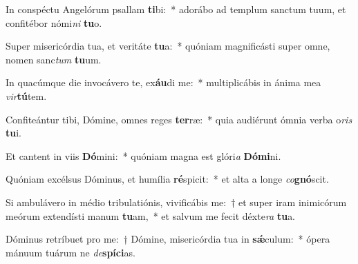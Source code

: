 \item In conspéctu Angelórum psallam \textbf{ti}bi:~* adorábo ad templum sanctum tuum, et confitébor nómi\textit{ni} \textbf{tu}o.
\item Super misericórdia tua, et veritáte \textbf{tu}a:~* quóniam magnificásti super omne, nomen sanc\textit{tum} \textbf{tu}um.
\item In quacúmque die invocávero te, ex\textbf{áu}di me:~* multiplicábis in ánima mea \textit{vir}\textbf{tú}tem.
\item Confiteántur tibi, Dómine, omnes reges \textbf{ter}ræ:~* quia audiérunt ómnia verba o\textit{ris} \textbf{tu}i.
\item Et cantent in viis \textbf{Dó}mini:~* quóniam magna est glóri\textit{a} \textbf{Dó}\textbf{mi}ni.
\item Quóniam excélsus Dóminus, et humília \textbf{ré}spicit:~* et alta a longe \textit{co}\textbf{gnó}scit.
\item Si ambulávero in médio tribulatiónis, vivificábis me:~† et super iram inimicórum meórum extendísti manum \textbf{tu}am,~* et salvum me fecit déxte\textit{ra} \textbf{tu}a.
\item Dóminus retríbuet pro me:~† Dómine, misericórdia tua in \textbf{sǽ}culum:~* ópera mánuum tuárum ne \textit{de}\textbf{spí}\textbf{ci}as.
